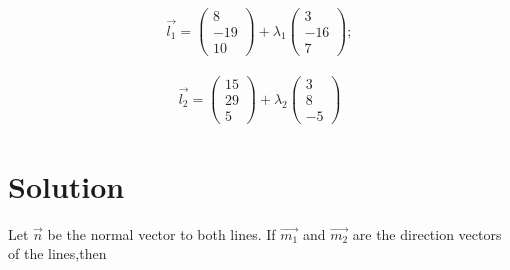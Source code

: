 \documentclass[journal,12pt,twocolumn]{IEEEtran}
\begin{document}
\begin{align}   
\vec{l_1} =\begin{pmatrix} 8\\ -19\\ 10\end{pmatrix} + \lambda_1
	\begin{pmatrix} 3 \\-16\\ 7\end{pmatrix} ;
\end{align}

\begin{align} 
 \vec{l_2} =\begin{pmatrix}15\\ 29\\ 5\end{pmatrix} + \lambda_2
	\begin{pmatrix} 3 \\8\\ -5\end{pmatrix} 
\end{align}
\section{Solution}
	Let $\vec{n}$ be the normal vector to both lines. If $\vec{m_1}$ and $\vec{m_2}$ are the direction vectors of the lines,then
\par
\end{document}
